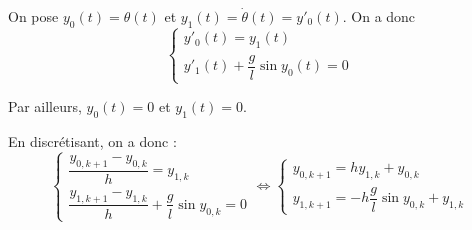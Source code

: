 \begin{corrigebox}
On pose $y_0(t) = \theta(t) $ et $y_1(t) = \dot{\theta}(t) = y'_0(t) $. On a donc 
$$
\left\{
\begin{array}{l}
y'_0(t) = y_1(t) \\
y'_1(t) + \dfrac{g}{l} \sin y_0(t) = 0
\end{array} 
\right.
$$

Par ailleurs, $y_0(t) = 0 $ et $y_1(t) =0$.

En discrétisant, on a donc :
$$
\left\{
\begin{array}{l}
\dfrac{y_{0,k+1}-y_{0,k}}{h} = y_{1,k} \\
\dfrac{y_{1,k+1}-y_{1,k}}{h} + \dfrac{g}{l} \sin y_{0,k} = 0
\end{array} 
\right.
\Longleftrightarrow
\left\{
\begin{array}{l}
y_{0,k+1} = h y_{1,k} + y_{0,k}\\
y_{1,k+1} = - h \dfrac{g}{l} \sin y_{0,k}  + y_{1,k}
\end{array} 
\right.
$$
\end{corrigebox}
